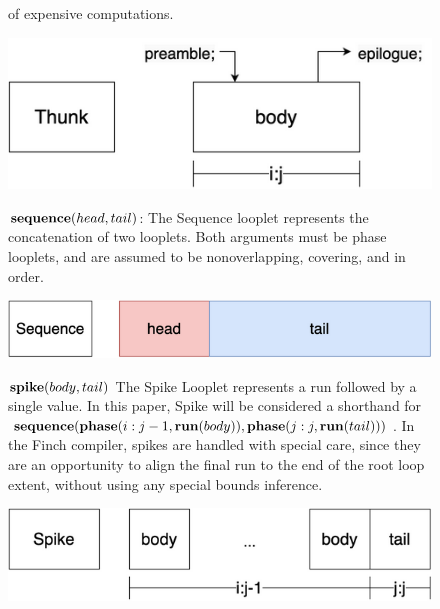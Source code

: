 \begin{figure}[ht]
\begin{minipage}[c]{0.6\linewidth}
        of expensive computations.
    \end{minipage}%
    \begin{minipage}[c]{0.4\linewidth}
        \centering
        \includegraphics[scale=0.25]{Looplets-thunk.png}
    \end{minipage}

    \begin{minipage}[c]{0.6\linewidth}
        $\text{\textbf{sequence}}(head, tail)$: The Sequence looplet represents the
        concatenation of two looplets. Both arguments must be phase looplets, and
        are assumed to be nonoverlapping, covering, and in order.
    \end{minipage}%
    \begin{minipage}[c]{0.4\linewidth}
        \centering
        \includegraphics[scale=0.25]{Looplets-sequence.png}
    \end{minipage}

    \begin{minipage}[c]{0.6\linewidth}
        $\text{\textbf{spike}}(body, tail)$ The Spike Looplet represents a run
        followed by a single value. In this paper, Spike will be considered a
        shorthand for $\text{\textbf{sequence}}(\text{\textbf{phase}}(i:j-1, \text{\textbf{run}}(body)),
        \text{\textbf{phase}}(j:j, \text{\textbf{run}}(tail)))$.  In the Finch compiler, spikes are
        handled with special care, since they are an opportunity to align the
        final run to the end of the root loop extent, without using any special
        bounds inference.
    \end{minipage}%
    \begin{minipage}[c]{0.4\linewidth}
        \centering
        \includegraphics[scale=0.25]{Looplets-spike.png}
    \end{minipage}


\end{figure}
